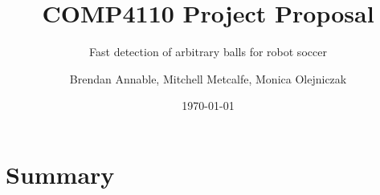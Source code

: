 \documentclass[11pt]{scrartcl}
\title{COMP4110 Project Proposal}
\subtitle{Fast detection of arbitrary balls for robot soccer}
\author{ Brendan Annable, Mitchell Metcalfe, Monica Olejniczak }
\date{\today}
\begin{document}
	\maketitle

	\begin{abstract}
		
		
	\end{abstract}

	\newpage
	\tableofcontents
	\newpage


	\section{Summary} {

		
	}
\end{document}
